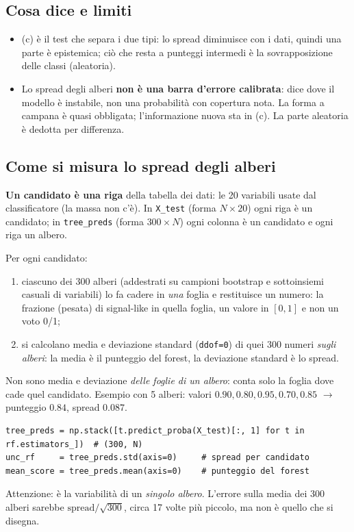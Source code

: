 \documentclass[10.5pt,a4paper]{article}
\begin{document}
\subsection*{Cosa dice e limiti}
\begin{itemize}
\item (c) è il test che separa i due tipi: lo spread diminuisce con i dati, quindi una parte è epistemica; ciò che resta a punteggi
intermedi è la sovrapposizione delle classi (aleatoria).
\item Lo spread degli alberi \textbf{non è una barra d'errore calibrata}: dice dove il modello è instabile, non una probabilità con
copertura nota. La forma a campana è quasi obbligata; l'informazione nuova sta in (c). La parte aleatoria è dedotta per differenza.
\end{itemize}

\subsection*{Come si misura lo spread degli alberi}
\textbf{Un candidato è una riga} della tabella dei dati: le 20 variabili usate dal classificatore (la massa non c'è). In \texttt{X\_test}
(forma $N\times20$) ogni riga è un candidato; in \texttt{tree\_preds} (forma $300\times N$) ogni colonna è un candidato e ogni riga un albero.

Per ogni candidato:
\begin{enumerate}
\item ciascuno dei 300 alberi (addestrati su campioni bootstrap e sottoinsiemi casuali di variabili) lo fa cadere in \emph{una} foglia e
restituisce un numero: la frazione (pesata) di signal-like in quella foglia, un valore in $[0,1]$ e non un voto 0/1;
\item si calcolano media e deviazione standard (\texttt{ddof=0}) di quei 300 numeri \emph{sugli alberi}: la media è il punteggio del
forest, la deviazione standard è lo spread.
\end{enumerate}
Non sono media e deviazione \emph{delle foglie di un albero}: conta solo la foglia dove cade quel candidato. Esempio con 5 alberi:
valori $0.90,0.80,0.95,0.70,0.85$ $\to$ punteggio $0.84$, spread $0.087$.
\begin{center}\begin{minipage}{0.92\linewidth}\footnotesize
\begin{verbatim}
tree_preds = np.stack([t.predict_proba(X_test)[:, 1] for t in rf.estimators_])  # (300, N)
unc_rf     = tree_preds.std(axis=0)     # spread per candidato
mean_score = tree_preds.mean(axis=0)    # punteggio del forest
\end{verbatim}
\end{minipage}\end{center}
Attenzione: è la variabilità di un \emph{singolo albero}. L'errore sulla media dei 300 alberi sarebbe $\text{spread}/\sqrt{300}$,
circa 17 volte più piccolo, ma non è quello che si disegna.
\end{document}
